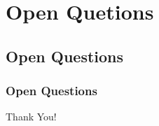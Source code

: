 \documentclass{beamer}
\makeatletter
\let\beamer@writeslidentry@miniframeson=\beamer@writeslidentry%
\def\beamer@writeslidentry@miniframesoff{%
  \expandafter\beamer@ifempty\expandafter{\beamer@framestartpage}{}%
  {%
    \clearpage\beamer@notesactions%
  }
}
\newcommand*{\miniframeson}{\let\beamer@writeslidentry=\beamer@writeslidentry@miniframeson}
\newcommand*{\miniframesoff}{\let\beamer@writeslidentry=\beamer@writeslidentry@miniframesoff}
\makeatother
\begin{document}
\section{Open Quetions}
\subsection{Open Questions}
\begin{frame}
\frametitle{Open Questions}
\end{frame}

\miniframesoff


\begin{frame}[plain]
 \vskip 1cm 
\begin{center}
Thank You!
\end{center}
\end{frame}


\begin{frame}[plain]
\end{frame}

\begin{frame}[plain]
\end{frame}

\begin{frame}[plain]
\end{frame}

\miniframeson
\end{document}
